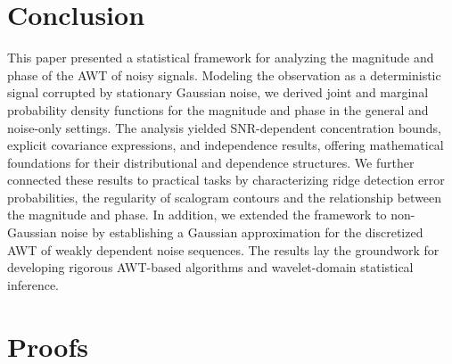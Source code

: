 \documentclass{amsart}
\begin{document}
\section{Conclusion}\label{sec:conclusion}
This paper presented a statistical framework for analyzing the magnitude and phase of the AWT of noisy signals. Modeling the observation as a deterministic signal corrupted by stationary Gaussian noise, we derived joint and marginal probability density functions for the magnitude and phase in the general and noise-only settings. The analysis yielded SNR-dependent concentration bounds, explicit covariance expressions, and independence results, offering mathematical foundations for their distributional and dependence structures. We further connected these results to practical tasks by characterizing ridge detection error probabilities, the regularity of scalogram contours and the relationship between the magnitude and phase.
 In addition, we extended the framework to non-Gaussian noise by establishing a Gaussian approximation for the discretized AWT of weakly dependent noise sequences.
The results lay the groundwork for developing rigorous AWT-based algorithms and wavelet-domain statistical inference.






\section{Proofs}\label{sec:proof}
\end{document}
